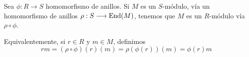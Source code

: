 \begin{prop}
  Sea \(\phi:R\longrightarrow S\) homomorfismo de anillos. Si \(M\)
  es un \(S\)-módulo, vía un homomorfismo de anillos \(\rho:
  S\longrightarrow\operatorname{End}(M)\), tenemos que \(M\) es un
  \(R\)-módulo vía \(\rho\circ\phi\).

  Equivalentemente, si \(r\in R\) y \(m\in M\), definimos
  \[
    rm=(\rho\circ\phi)(r)(m)=\rho(\phi(r))(m)=\phi(r)m
  \]
\end{prop}

